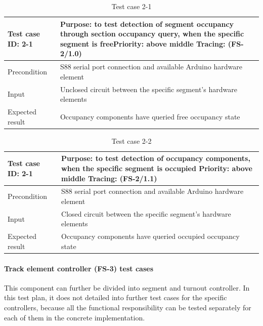 \begin{table}[H]
	\caption{Test case 2-1}
	\label{table:TCase-FS2-1}
	\begin{center}
		\renewcommand{\arraystretch}{1.8}
		\begin{tabu} 
			to 0.9 \textwidth
			{  X[0.4, c] X[c] }
			\toprule
			Test case ID: 2-1 & Purpose: to test detection of segment occupancy through section occupancy query, when the specific segment is free\newline Priority: above middle \newline Tracing: (FS-2/1.0)\\ \midrule
			Precondition & S88 serial port connection and available Arduino hardware element \\
			Input & Unclosed circuit between the specific segment's hardware elements  \\
			Expected result & Occupancy components have queried free occupancy state \\ \bottomrule
		\end{tabu}
	\end{center}
\end{table} 

\begin{table}[H]
	\caption{Test case 2-2}
	\label{table:TCase-FS2-2}
	\begin{center}
		\renewcommand{\arraystretch}{1.8}
		\begin{tabu} 
			to 0.9 \textwidth
			{  X[0.4, c] X[c] }
			\toprule
			Test case ID: 2-1 & Purpose: to test detection of occupancy components, when the specific segment is occupied \newline Priority: above middle \newline Tracing: (FS-2/1.1)\\ \midrule
			Precondition & S88 serial port connection and available Arduino hardware element \\
			Input & Closed circuit between the specific segment's hardware elements  \\
			Expected result & Occupancy components have queried occupied occupancy state \\ \bottomrule
		\end{tabu}
	\end{center}
\end{table} 

\paragraph{Track element controller (FS-3)  test cases} This component can further be divided into segment and turnout controller. In this test plan, it does not detailed into further test cases for the specific controllers, because all the functional responsibility can be tested separately for each of them in the concrete implementation.

